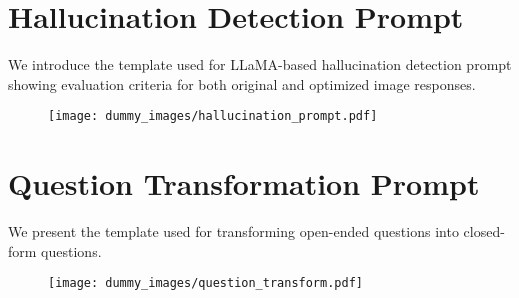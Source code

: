 \documentclass[runningheads]{llncs}
\begin{document}


\newpage
\appendix
\section{Hallucination Detection Prompt}
\label{appendix:prompt-template}
We introduce the template used for LLaMA-based hallucination detection prompt showing evaluation criteria for both original and optimized image responses.
\begin{figure}[ht!]
\centering
\texttt{[image: dummy\_images/hallucination\_prompt.pdf]}
\end{figure}

\section{Question Transformation Prompt}
\label{appendix:question_transform}
We present the template used for transforming open-ended questions into closed-form questions.
\begin{figure}[ht!]
\centering
\texttt{[image: dummy\_images/question\_transform.pdf]}
\end{figure}

\newpage
\end{document}
